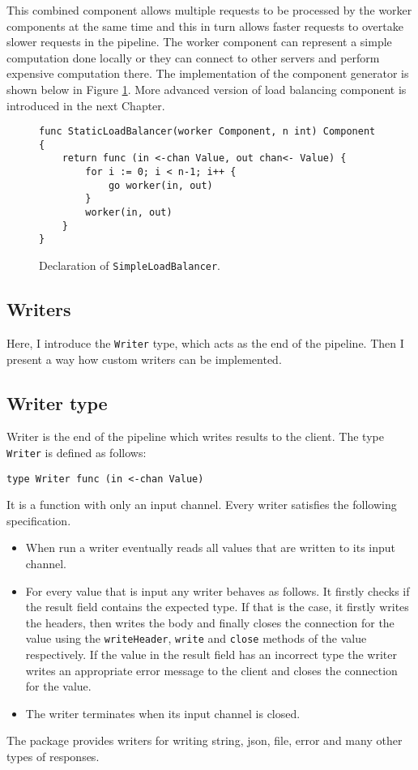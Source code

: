 \documentclass[12pt,a4paper]{article}
\begin{document}
This combined component allows multiple requests to be processed by the worker
components at the same time and this in turn allows faster requests to 
overtake slower requests in the pipeline. The worker component can represent
a simple computation done locally or they can connect to other servers
and perform expensive computation there. The implementation of the 
component generator is shown below in Figure \ref{fig:slb}.
More advanced version of load balancing component is introduced in the 
next Chapter.
\begin{figure}[h]
\centering
\begin{lstlisting}
func StaticLoadBalancer(worker Component, n int) Component {
    return func (in <-chan Value, out chan<- Value) {
        for i := 0; i < n-1; i++ {
            go worker(in, out)
        }
        worker(in, out)
    }
}
\end{lstlisting}
\caption[scale=1.0]{Declaration of \texttt{SimpleLoadBalancer}.}
\label{fig:slb}
\end{figure}

\subsection{Writers}
Here, I introduce the \texttt{Writer} type, which acts as the end of the 
pipeline. Then I present a way how custom writers can be implemented.
\subsection{Writer type}
Writer is the end of the pipeline which writes results to the client.
The type \texttt{Writer} is defined as follows:
\begin{lstlisting}
type Writer func (in <-chan Value)
\end{lstlisting}
It is a function with only an input channel.
Every writer satisfies the following specification.
\begin{itemize}
    \item When run a writer eventually reads all values that are written 
          to its input channel.

	\item For every value that is input any writer behaves as follows. 
          It firstly checks if the result field contains the expected type. 
          If that is the case, it firstly writes the headers, then
          writes the body and finally closes the connection for the value
          using the \texttt{writeHeader}, \texttt{write} and \texttt{close}
          methods of the value respectively. If the value in the result 
          field has an incorrect type the writer writes an appropriate 
          error message to the client and closes the connection for the value. 

	\item The writer terminates when its input channel is closed.
\end{itemize}
The package provides writers for writing string, json, file, error and many
other types of responses.
\end{document}
